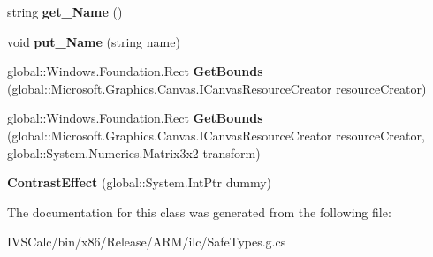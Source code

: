 \begin{DoxyCompactItemize}
\item 
\mbox{\label{class_microsoft_1_1_graphics_1_1_canvas_1_1_effects_1_1_contrast_effect_aaecf19cce74e2ea970a1c0c6f2adf75c}} 
string {\bfseries get\+\_\+\+Name} ()
\item 
\mbox{\label{class_microsoft_1_1_graphics_1_1_canvas_1_1_effects_1_1_contrast_effect_abc318b4aa26dee2333a52d0e70b53a88}} 
void {\bfseries put\+\_\+\+Name} (string name)
\item 
\mbox{\label{class_microsoft_1_1_graphics_1_1_canvas_1_1_effects_1_1_contrast_effect_a8d8d0baa90784d8ceef5e69730b00aa4}} 
global\+::\+Windows.\+Foundation.\+Rect {\bfseries Get\+Bounds} (global\+::\+Microsoft.\+Graphics.\+Canvas.\+I\+Canvas\+Resource\+Creator resource\+Creator)
\item 
\mbox{\label{class_microsoft_1_1_graphics_1_1_canvas_1_1_effects_1_1_contrast_effect_a7d7ad97626f28fed20870cf46f5910da}} 
global\+::\+Windows.\+Foundation.\+Rect {\bfseries Get\+Bounds} (global\+::\+Microsoft.\+Graphics.\+Canvas.\+I\+Canvas\+Resource\+Creator resource\+Creator, global\+::\+System.\+Numerics.\+Matrix3x2 transform)
\item 
\mbox{\label{class_microsoft_1_1_graphics_1_1_canvas_1_1_effects_1_1_contrast_effect_a8088c0c5b388e6b2ce8eeb3b08c3c7b0}} 
{\bfseries Contrast\+Effect} (global\+::\+System.\+Int\+Ptr dummy)
\end{DoxyCompactItemize}


The documentation for this class was generated from the following file\+:\begin{DoxyCompactItemize}
\item 
I\+V\+S\+Calc/bin/x86/\+Release/\+A\+R\+M/ilc/Safe\+Types.\+g.\+cs\end{DoxyCompactItemize}
